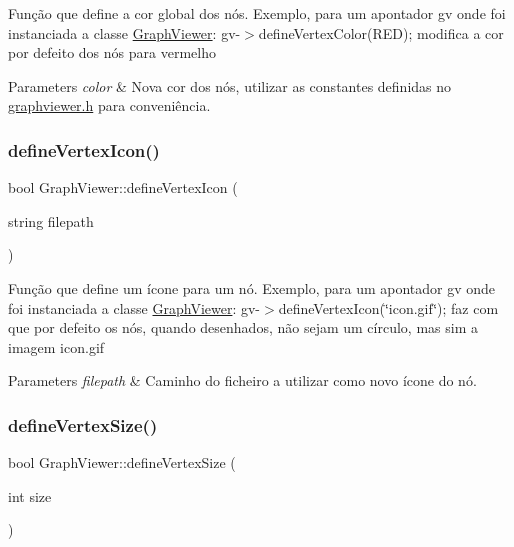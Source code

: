 Função que define a cor global dos nós. Exemplo, para um apontador gv onde foi instanciada a classe \mbox{\hyperlink{class_graph_viewer}{Graph\+Viewer}}\+: gv-\/$>$define\+Vertex\+Color(\+R\+E\+D); modifica a cor por defeito dos nós para vermelho


\begin{DoxyParams}{Parameters}
{\em color} & Nova cor dos nós, utilizar as constantes definidas no \mbox{\hyperlink{graphviewer_8h}{graphviewer.\+h}} para conveniência. \\
\hline
\end{DoxyParams}
\mbox{\label{class_graph_viewer_af1adb6a361457187a820e01dcf0a34b7}} 
\subsubsection{\texorpdfstring{define\+Vertex\+Icon()}{defineVertexIcon()}}
{\footnotesize\ttfamily bool Graph\+Viewer\+::define\+Vertex\+Icon (\begin{DoxyParamCaption}\item[{string}]{filepath }\end{DoxyParamCaption})}

Função que define um ícone para um nó. Exemplo, para um apontador gv onde foi instanciada a classe \mbox{\hyperlink{class_graph_viewer}{Graph\+Viewer}}\+: gv-\/$>$define\+Vertex\+Icon(\char`\"{}icon.\+gif\char`\"{}); faz com que por defeito os nós, quando desenhados, não sejam um círculo, mas sim a imagem icon.\+gif


\begin{DoxyParams}{Parameters}
{\em filepath} & Caminho do ficheiro a utilizar como novo ícone do nó. \\
\hline
\end{DoxyParams}
\mbox{\label{class_graph_viewer_ac4b2a9fec74d38e64088aa79ca4b7d9b}} 
\subsubsection{\texorpdfstring{define\+Vertex\+Size()}{defineVertexSize()}}
{\footnotesize\ttfamily bool Graph\+Viewer\+::define\+Vertex\+Size (\begin{DoxyParamCaption}\item[{int}]{size }\end{DoxyParamCaption})}

